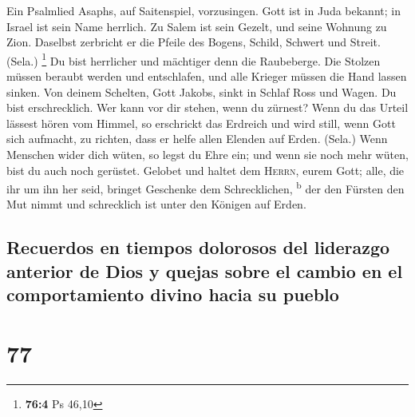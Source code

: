  Ein Psalmlied Asaphs, auf Saitenspiel, vorzusingen.
 Gott ist in Juda bekannt; in Israel ist sein Name
herrlich.  Zu Salem ist sein Gezelt, und seine Wohnung zu
Zion.  Daselbst zerbricht er die Pfeile des Bogens,
Schild, Schwert und Streit. (Sela.) \footnote{\textbf{76:4} Ps 46,10}
 Du bist herrlicher und mächtiger denn die Raubeberge.
 Die Stolzen müssen beraubt werden und entschlafen, und
alle Krieger müssen die Hand lassen sinken.  Von deinem
Schelten, Gott Jakobs, sinkt in Schlaf Ross und Wagen.  Du
bist erschrecklich. Wer kann vor dir stehen, wenn du zürnest?
 Wenn du das Urteil lässest hören vom Himmel, so
erschrickt das Erdreich und wird still,  wenn Gott sich
aufmacht, zu richten, dass er helfe allen Elenden auf Erden. (Sela.)
 Wenn Menschen wider dich wüten, so legst du Ehre ein;
und wenn sie noch mehr wüten, bist du auch noch gerüstet.
 Gelobet und haltet dem \textsc{Herrn}, eurem Gott; alle,
die ihr um ihn her seid, bringet Geschenke dem Schrecklichen,
\textsuperscript{b}  der den Fürsten den Mut nimmt und
schrecklich ist unter den Königen auf Erden.

\hypertarget{recuerdos-en-tiempos-dolorosos-del-liderazgo-anterior-de-dios-y-quejas-sobre-el-cambio-en-el-comportamiento-divino-hacia-su-pueblo}{%
\subsection{Recuerdos en tiempos dolorosos del liderazgo anterior de
Dios y quejas sobre el cambio en el comportamiento divino hacia su
pueblo}\label{recuerdos-en-tiempos-dolorosos-del-liderazgo-anterior-de-dios-y-quejas-sobre-el-cambio-en-el-comportamiento-divino-hacia-su-pueblo}}

\hypertarget{section-76}{%
\section{77}\label{section-76}}

